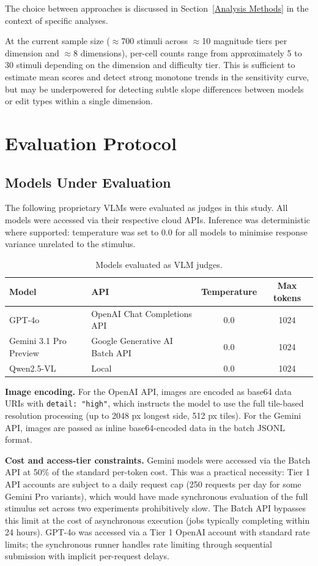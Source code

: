 The choice between approaches is discussed in Section~\ref{Analysis Methods} in the context of specific analyses.

At the current sample size ($\approx$700 stimuli across $\approx$10 magnitude tiers per dimension and $\approx$8 dimensions), per-cell counts range from approximately 5 to 30 stimuli depending on the dimension and difficulty tier. This is sufficient to estimate mean scores and detect strong monotone trends in the sensitivity curve, but may be underpowered for detecting subtle slope differences between models or edit types within a single dimension.


\section{Evaluation Protocol} \label{Evaluation Protocol}

\subsection{Models Under Evaluation} \label{Models Under Evaluation}

The following proprietary VLMs were evaluated as judges in this study. All models were accessed via their respective cloud APIs. Inference was deterministic where supported: temperature was set to 0.0 for all models to minimise response variance unrelated to the stimulus.

\begin{table}[htbp]
\centering
\caption{Models evaluated as VLM judges.}
\label{tab:models}
\begin{tabular}{llcc}
\toprule
Model & API & Temperature & Max tokens \\
\midrule
GPT-4o & OpenAI Chat Completions API & 0.0 & 1024 \\
Gemini 3.1 Pro Preview & Google Generative AI Batch API & 0.0 & 1024 \\
Qwen2.5-VL & Local & 0.0 & 1024 \\
\bottomrule
\end{tabular}
\end{table}

\textbf{Image encoding.} For the OpenAI API, images are encoded as base64 data URIs with \texttt{detail: "high"}, which instructs the model to use the full tile-based resolution processing (up to 2048 px longest side, 512 px tiles). For the Gemini API, images are passed as inline base64-encoded data in the batch JSONL format.

\textbf{Cost and access-tier constraints.} Gemini models were accessed via the Batch API at 50\% of the standard per-token cost. This was a practical necessity: Tier 1 API accounts are subject to a daily request cap (250 requests per day for some Gemini Pro variants), which would have made synchronous evaluation of the full stimulus set across two experiments prohibitively slow. The Batch API bypasses this limit at the cost of asynchronous execution (jobs typically completing within 24 hours). GPT-4o was accessed via a Tier 1 OpenAI account with standard rate limits; the synchronous runner handles rate limiting through sequential submission with implicit per-request delays.

